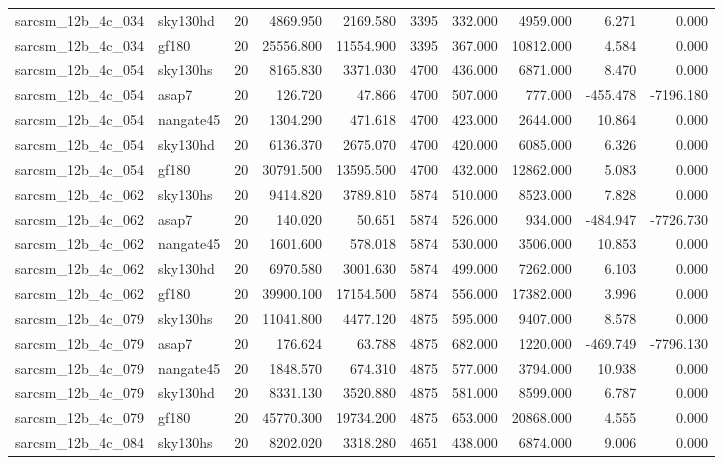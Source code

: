 \documentclass{article}
\begin{document}
\begin{longtable}{llrrrrrrrr}
sarcsm\_12b\_4c\_034 & sky130hd & 20 & 4869.950 & 2169.580 & 3395 & 332.000 & 4959.000 & 6.271 & 0.000 \\
sarcsm\_12b\_4c\_034 & gf180 & 20 & 25556.800 & 11554.900 & 3395 & 367.000 & 10812.000 & 4.584 & 0.000 \\
sarcsm\_12b\_4c\_054 & sky130hs & 20 & 8165.830 & 3371.030 & 4700 & 436.000 & 6871.000 & 8.470 & 0.000 \\
sarcsm\_12b\_4c\_054 & asap7 & 20 & 126.720 & 47.866 & 4700 & 507.000 & 777.000 & -455.478 & -7196.180 \\
sarcsm\_12b\_4c\_054 & nangate45 & 20 & 1304.290 & 471.618 & 4700 & 423.000 & 2644.000 & 10.864 & 0.000 \\
sarcsm\_12b\_4c\_054 & sky130hd & 20 & 6136.370 & 2675.070 & 4700 & 420.000 & 6085.000 & 6.326 & 0.000 \\
sarcsm\_12b\_4c\_054 & gf180 & 20 & 30791.500 & 13595.500 & 4700 & 432.000 & 12862.000 & 5.083 & 0.000 \\
sarcsm\_12b\_4c\_062 & sky130hs & 20 & 9414.820 & 3789.810 & 5874 & 510.000 & 8523.000 & 7.828 & 0.000 \\
sarcsm\_12b\_4c\_062 & asap7 & 20 & 140.020 & 50.651 & 5874 & 526.000 & 934.000 & -484.947 & -7726.730 \\
sarcsm\_12b\_4c\_062 & nangate45 & 20 & 1601.600 & 578.018 & 5874 & 530.000 & 3506.000 & 10.853 & 0.000 \\
sarcsm\_12b\_4c\_062 & sky130hd & 20 & 6970.580 & 3001.630 & 5874 & 499.000 & 7262.000 & 6.103 & 0.000 \\
sarcsm\_12b\_4c\_062 & gf180 & 20 & 39900.100 & 17154.500 & 5874 & 556.000 & 17382.000 & 3.996 & 0.000 \\
sarcsm\_12b\_4c\_079 & sky130hs & 20 & 11041.800 & 4477.120 & 4875 & 595.000 & 9407.000 & 8.578 & 0.000 \\
sarcsm\_12b\_4c\_079 & asap7 & 20 & 176.624 & 63.788 & 4875 & 682.000 & 1220.000 & -469.749 & -7796.130 \\
sarcsm\_12b\_4c\_079 & nangate45 & 20 & 1848.570 & 674.310 & 4875 & 577.000 & 3794.000 & 10.938 & 0.000 \\
sarcsm\_12b\_4c\_079 & sky130hd & 20 & 8331.130 & 3520.880 & 4875 & 581.000 & 8599.000 & 6.787 & 0.000 \\
sarcsm\_12b\_4c\_079 & gf180 & 20 & 45770.300 & 19734.200 & 4875 & 653.000 & 20868.000 & 4.555 & 0.000 \\
sarcsm\_12b\_4c\_084 & sky130hs & 20 & 8202.020 & 3318.280 & 4651 & 438.000 & 6874.000 & 9.006 & 0.000 \\

\end{longtable}
\end{document}

